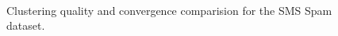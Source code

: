 \documentclass[runningheads]{llncs}
\begin{document}
\begin{figure}[h]
\centering
{}
\\
\caption{Clustering quality and convergence comparision for the SMS Spam dataset.}
\label{fig:smsspam}
\end{figure}    
\end{document}
